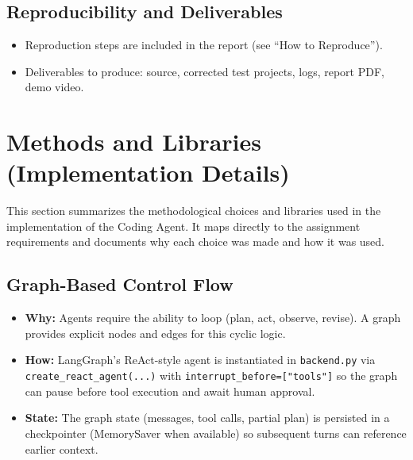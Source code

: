 \documentclass[12pt, a4paper]{article}
\begin{document}
\subsection{Reproducibility and Deliverables}
\begin{itemize}
  \item Reproduction steps are included in the report (see ``How to Reproduce'').
  \item Deliverables to produce: source, corrected test projects, logs, report PDF, demo video.
\end{itemize}

\section{Methods and Libraries (Implementation Details)}
This section summarizes the methodological choices and libraries used in the implementation of the Coding Agent. It maps directly to the assignment requirements and documents why each choice was made and how it was used.

\subsection{Graph-Based Control Flow}
\begin{itemize}
  \item \textbf{Why:} Agents require the ability to loop (plan, act, observe, revise). A graph provides explicit nodes and edges for this cyclic logic.
  \item \textbf{How:} LangGraph's ReAct-style agent is instantiated in \texttt{backend.py} via \texttt{create\_react\_agent(...)} with \texttt{interrupt\_before=["tools"]} so the graph can pause before tool execution and await human approval.
  \item \textbf{State:} The graph state (messages, tool calls, partial plan) is persisted in a checkpointer (MemorySaver when available) so subsequent turns can reference earlier context.
\end{itemize}
\end{document}
